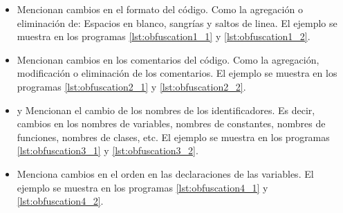 \begin{itemize}
    \item \cite{article3} Mencionan cambios en el formato del código. Como la agregación o eliminación de: Espacios en blanco, sangrías y saltos de linea. El ejemplo se muestra en los programas \ref{lst:obfuscation1_1} y \ref{lst:obfuscation1_2}.
    
    

    \item \cite{article3} Mencionan cambios en los comentarios del código. Como la agregación, modificación o eliminación de los comentarios. El ejemplo se muestra en los programas \ref{lst:obfuscation2_1} y \ref{lst:obfuscation2_2}.
    
    

    \item \cite{Zoran2012} y \cite{donaldson1981plagiarism} Mencionan el cambio de los nombres de los identificadores. Es decir, cambios en los nombres de variables, nombres de constantes, nombres de funciones, nombres de clases, etc. El ejemplo se  muestra en los programas \ref{lst:obfuscation3_1} y \ref{lst:obfuscation3_2}.
    
    

    \item \cite{donaldson1981plagiarism} Menciona cambios en el orden en las declaraciones de las variables. El ejemplo se muestra en los programas \ref{lst:obfuscation4_1} y \ref{lst:obfuscation4_2}.
    
    


\end{itemize}
